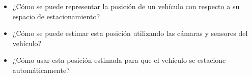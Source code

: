 \noindent
\begin{itemize}
    \item ¿Cómo se puede representar la posición de un vehículo con respecto a su espacio de estacionamiento?
    \item ¿Cómo se puede estimar esta posición utilizando las cámaras y sensores del vehículo?
    \item ¿Cómo usar esta posición estimada para que el vehículo se estacione automáticamente?
\end{itemize}